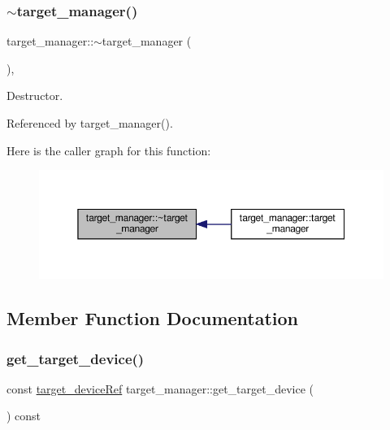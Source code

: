 \subsubsection{\texorpdfstring{$\sim$target\+\_\+manager()}{~target\_manager()}}
{\footnotesize\ttfamily target\+\_\+manager\+::$\sim$target\+\_\+manager (\begin{DoxyParamCaption}{ }\end{DoxyParamCaption})\hspace{0.3cm}{\ttfamily [virtual]}, {\ttfamily [default]}}



Destructor. 



Referenced by target\+\_\+manager().

Here is the caller graph for this function\+:
\nopagebreak
\begin{figure}[H]
\begin{center}
\leavevmode
\includegraphics[width=350pt]{da/d43/classtarget__manager_a0242b720a0790005dc499fbc30c677e2_icgraph}
\end{center}
\end{figure}


\subsection{Member Function Documentation}
\mbox{\label{classtarget__manager_a3e45c4d4d04291c6b30b9a9219a891f1}} 
\subsubsection{\texorpdfstring{get\+\_\+target\+\_\+device()}{get\_target\_device()}}
{\footnotesize\ttfamily const \hyperlink{target__device_8hpp_acedb2b7a617e27e6354a8049fee44eda}{target\+\_\+device\+Ref} target\+\_\+manager\+::get\+\_\+target\+\_\+device (\begin{DoxyParamCaption}{ }\end{DoxyParamCaption}) const}



